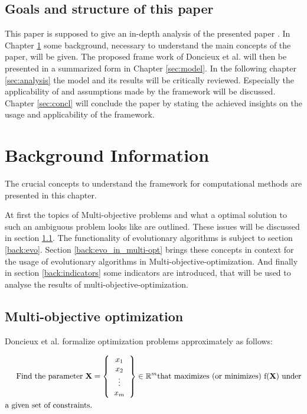 \documentclass[12pt,twoside]{article}
\theoremstyle{plain}
\theoremstyle{definition}
\theoremstyle{remark}
\begin{document}
\subsection{Goals and structure of this paper}
This paper is supposed to give an in-depth analysis of the presented paper \cite{doncieux2015multi}.
In Chapter \ref{sec:background} some background, necessary to understand the main concepts of the paper, will be given.
The proposed frame work of Doncieux et al. will then be presented in a summarized form in Chapter \ref{sec:model}.
In the following chapter \ref{sec:analysis} the model and its results will be critically reviewed.
Especially the applicability of and assumptions made by the framework will be discussed.
Chapter \ref{sec:concl} will conclude the paper by stating the achieved insights on the usage and applicability of the framework. 
\section{Background Information}
\label{sec:background}
The crucial concepts to understand the framework for computational methods are presented in this chapter.

At first the topics of Multi-objective problems and what a optimal solution to such an ambiguous problem looks like are outlined. These issues will be discussed in section \ref{back:multi-opt}. 
The functionality of evolutionary algorithms is subject to section \ref{back:evo}.
Section \ref{back:evo_in_multi-opt} brings these concepts in context for the usage of evolutionary algorithms in Multi-objective-optimization.
And finally in section \ref{back:indicators} some indicators are introduced, that will be used to analyse the results of multi-objective-optimization.

\subsection{Multi-objective optimization}
\label{back:multi-opt}
Doncieux et al. \cite{doncieux2015multi} formalize optimization problems approximately as follows:

\begin{align*}
	\text{Find the parameter }\textbf{X} &=
	\left \{
	\begin{tabular}{c}
		$x_1$\\
		$x_2$\\
		\vdots\\
		$x_m$
	\end{tabular}
	\right \}
	\in \mathbb{R}^m \text{that maximizes (or minimizes) f(\textbf{X}) under}\\
		 \text{a given set of constraints.}
\end{align*}
\end{document}
